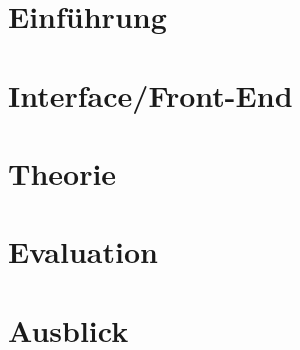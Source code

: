 \documentclass[12pt,ngerman,project]{dbvstudentwork}
\begin{document}
	
	\begin{dbvstudentworkTitlepage}
		
		
		
		
		\Deadline{\today}
		
		
	\end{dbvstudentworkTitlepage}
	
	\tableofcontents
	\clearpage
	
	
	\section{Einführung}
	\label{sec:introduction}
		
	
	\section{Interface/Front-End}
	\label{sec:frontend}
		
	\section{Theorie}
	\label{sec:theorie}
		
		
	\section{Evaluation}
	\label{sec:evaluation}
		
		
	\section{Ausblick}
	\label{sec:lessonslearned}
		

	
	\singlespacing
	
	\clearpage
	
	\clearpage
	\listoffigures %
	\clearpage
	
\end{document}
